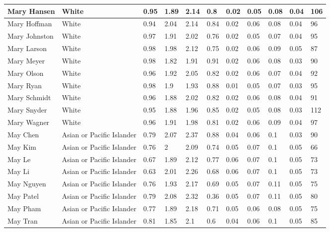 \begin{table}[!ht]
\begin{tabular}{|l|l|l|l|l|l|l|l|l|l|l|}
        Mary Hansen & White & 0.95 & 1.89 & 2.14 & 0.8 & 0.02 & 0.05 & 0.08 & 0.04 & 106 \\ \hline
        Mary Hoffman & White & 0.94 & 2.04 & 2.14 & 0.84 & 0.02 & 0.06 & 0.08 & 0.04 & 96 \\ \hline
        Mary Johnston & White & 0.97 & 1.91 & 2.02 & 0.76 & 0.02 & 0.05 & 0.07 & 0.04 & 95 \\ \hline
        Mary Larson & White & 0.98 & 1.98 & 2.12 & 0.75 & 0.02 & 0.06 & 0.09 & 0.05 & 87 \\ \hline
        Mary Meyer & White & 0.98 & 1.82 & 1.91 & 0.91 & 0.02 & 0.06 & 0.08 & 0.03 & 90 \\ \hline
        Mary Olson & White & 0.96 & 1.92 & 2.05 & 0.82 & 0.02 & 0.06 & 0.07 & 0.04 & 92 \\ \hline
        Mary Ryan & White & 0.98 & 1.9 & 1.93 & 0.88 & 0.01 & 0.05 & 0.07 & 0.03 & 95 \\ \hline
        Mary Schmidt & White & 0.96 & 1.88 & 2.02 & 0.82 & 0.02 & 0.06 & 0.08 & 0.04 & 91 \\ \hline
        Mary Snyder & White & 0.95 & 1.88 & 1.96 & 0.85 & 0.02 & 0.05 & 0.08 & 0.03 & 112 \\ \hline
        Mary Wagner & White & 0.96 & 1.91 & 1.98 & 0.81 & 0.02 & 0.06 & 0.09 & 0.04 & 97 \\ \hline
        May Chen & Asian or Pacific Islander & 0.79 & 2.07 & 2.37 & 0.88 & 0.04 & 0.06 & 0.1 & 0.03 & 90 \\ \hline
        May Kim & Asian or Pacific Islander & 0.76 & 2 & 2.09 & 0.74 & 0.05 & 0.07 & 0.1 & 0.05 & 66 \\ \hline
        May Le & Asian or Pacific Islander & 0.67 & 1.89 & 2.12 & 0.77 & 0.06 & 0.07 & 0.1 & 0.05 & 73 \\ \hline
        May Li & Asian or Pacific Islander & 0.63 & 2.01 & 2.26 & 0.68 & 0.06 & 0.07 & 0.1 & 0.05 & 73 \\ \hline
        May Nguyen & Asian or Pacific Islander & 0.76 & 1.93 & 2.17 & 0.69 & 0.05 & 0.07 & 0.11 & 0.05 & 75 \\ \hline
        May Patel & Asian or Pacific Islander & 0.79 & 2.08 & 2.32 & 0.36 & 0.05 & 0.07 & 0.11 & 0.05 & 80 \\ \hline
        May Pham & Asian or Pacific Islander & 0.77 & 1.89 & 2.18 & 0.71 & 0.05 & 0.06 & 0.08 & 0.05 & 75 \\ \hline
        May Tran & Asian or Pacific Islander & 0.81 & 1.85 & 2.1 & 0.6 & 0.04 & 0.06 & 0.1 & 0.05 & 85 \\ \hline

\end{tabular}
\end{table}
